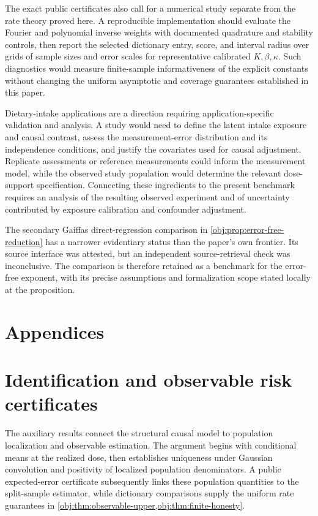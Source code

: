\documentclass[11pt]{article}
\begin{document}
The exact public certificates also call for a numerical study separate from the rate theory proved here. A reproducible implementation should evaluate the Fourier and polynomial inverse weights with documented quadrature and stability controls, then report the selected dictionary entry, score, and interval radius over grids of sample sizes and error scales for representative calibrated \(K,\beta,\kappa\). Such diagnostics would measure finite-sample informativeness of the explicit constants without changing the uniform asymptotic and coverage guarantees established in this paper.

Dietary-intake applications are a direction requiring application-specific validation and analysis. A study would need to define the latent intake exposure and causal contrast, assess the measurement-error distribution and its independence conditions, and justify the covariates used for causal adjustment. Replicate assessments or reference measurements could inform the measurement model, while the observed study population would determine the relevant dose-support specification. Connecting these ingredients to the present benchmark requires an analysis of the resulting observed experiment and of uncertainty contributed by exposure calibration and confounder adjustment.

The secondary Gaiffas direct-regression comparison in \cref{obj:prop:error-free-reduction} has a narrower evidentiary status than the paper's own frontier. Its source interface was attested, but an independent source-retrieval check was inconclusive. The comparison is therefore retained as a benchmark for the error-free exponent, with its precise assumptions and formalization scope stated locally at the proposition.


\appendix

\section*{Appendices}

\section{Identification and observable risk certificates}

The auxiliary results connect the structural causal model to population localization and observable estimation. The argument begins with conditional means at the realized dose, then establishes uniqueness under Gaussian convolution and positivity of localized population denominators. A public expected-error certificate subsequently links these population quantities to the split-sample estimator, while dictionary comparisons supply the uniform rate guarantees in \cref{obj:thm:observable-upper,obj:thm:finite-honesty}.
\end{document}
